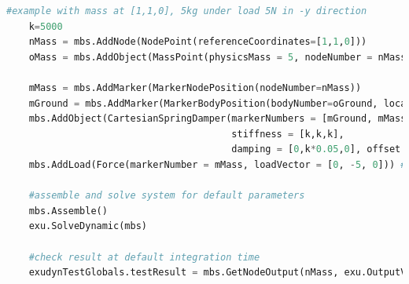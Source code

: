 \begin{lstlisting}[language=Python, firstnumber=1]
    #example with mass at [1,1,0], 5kg under load 5N in -y direction
    k=5000
    nMass = mbs.AddNode(NodePoint(referenceCoordinates=[1,1,0]))
    oMass = mbs.AddObject(MassPoint(physicsMass = 5, nodeNumber = nMass))
    
    mMass = mbs.AddMarker(MarkerNodePosition(nodeNumber=nMass))
    mGround = mbs.AddMarker(MarkerBodyPosition(bodyNumber=oGround, localPosition = [1,1,0]))
    mbs.AddObject(CartesianSpringDamper(markerNumbers = [mGround, mMass], 
                                        stiffness = [k,k,k], 
                                        damping = [0,k*0.05,0], offset = [0,0,0]))
    mbs.AddLoad(Force(markerNumber = mMass, loadVector = [0, -5, 0])) #static solution=-5/5000=-0.001m

    #assemble and solve system for default parameters
    mbs.Assemble()
    exu.SolveDynamic(mbs)

    #check result at default integration time
    exudynTestGlobals.testResult = mbs.GetNodeOutput(nMass, exu.OutputVariableType.Displacement)[1]

\end{lstlisting}

